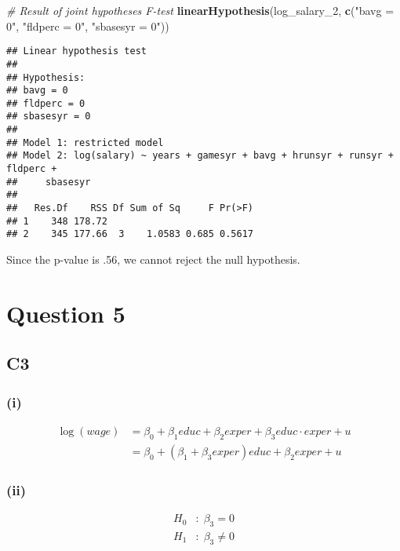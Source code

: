 \documentclass[
]{article}
\newenvironment{Shaded}{\begin{snugshade}}{\end{snugshade}}
\newcommand{\CommentTok}[1]{\textcolor[rgb]{0.56,0.35,0.01}{\textit{#1}}}
\newcommand{\DecValTok}[1]{\textcolor[rgb]{0.00,0.00,0.81}{#1}}
\newcommand{\KeywordTok}[1]{\textcolor[rgb]{0.13,0.29,0.53}{\textbf{#1}}}
\newcommand{\NormalTok}[1]{#1}
\newcommand{\StringTok}[1]{\textcolor[rgb]{0.31,0.60,0.02}{#1}}
\begin{document}
\begin{Shaded}
\begin{Highlighting}[]
\CommentTok{# Result of joint hypotheses F-test}
\KeywordTok{linearHypothesis}\NormalTok{(log_salary_}\DecValTok{2}\NormalTok{, }\KeywordTok{c}\NormalTok{(}\StringTok{"bavg = 0"}\NormalTok{, }\StringTok{"fldperc = 0"}\NormalTok{, }\StringTok{"sbasesyr = 0"}\NormalTok{))}
\end{Highlighting}
\end{Shaded}

\begin{verbatim}
## Linear hypothesis test
## 
## Hypothesis:
## bavg = 0
## fldperc = 0
## sbasesyr = 0
## 
## Model 1: restricted model
## Model 2: log(salary) ~ years + gamesyr + bavg + hrunsyr + runsyr + fldperc + 
##     sbasesyr
## 
##   Res.Df    RSS Df Sum of Sq     F Pr(>F)
## 1    348 178.72                          
## 2    345 177.66  3    1.0583 0.685 0.5617
\end{verbatim}

Since the p-value is .56, we cannot reject the null hypothesis.

\hypertarget{question-5}{%
\section{Question 5}\label{question-5}}

\hypertarget{c3-1}{%
\subsection{C3}\label{c3-1}}

\hypertarget{i-4}{%
\subsubsection{(i)}\label{i-4}}

\[\begin{aligned} 
\log(wage) &= \beta_0 + \beta_1 educ + \beta_2 exper + \beta_3 educ\cdot exper + u \\
&= \beta_0 + (\beta_1 + \beta_3 exper)educ + \beta_2 exper + u
\end{aligned}\]

\hypertarget{ii-4}{%
\subsubsection{(ii)}\label{ii-4}}

\[\begin{aligned}
H_0 &: \; \beta_3 = 0 \\
H_1 &: \; \beta_3 \ne 0
\end{aligned}\]
\end{document}
